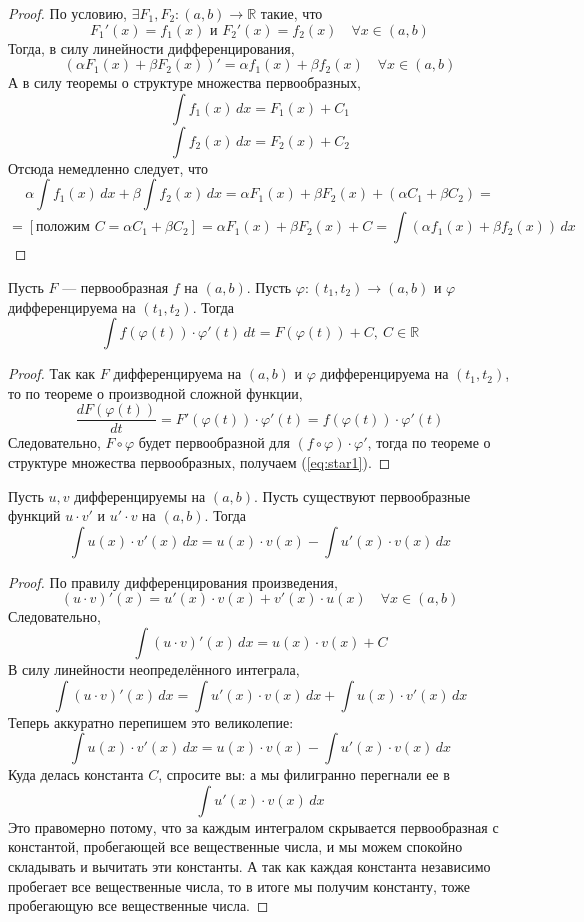 \documentclass[11pt]{article}
\begin{document}
\begin{proof}
    По условию, $\exists F_1, F_2: (a, b) \to \mathbb{R}$ такие, что \[F_1'(x) = f_1(x)
    \text{ и } F_2'(x) = f_2(x) \quad \forall x \in (a, b)\] Тогда, в силу линейности 
    дифференцирования, \[(\alpha F_1(x) + \beta F_2(x))' = \alpha f_1(x) + \beta f_2(x) \quad \forall x \in (a, b)\]
    А в силу теоремы о структуре множества первообразных, \[\int f_1(x)\,dx = F_1(x) + C_1\] 
    \[\int f_2(x)\,dx = F_2(x) + C_2\] Отсюда немедленно следует, что 
    \[\alpha \int f_1(x)\,dx + \beta \int f_2(x)\,dx = \alpha F_1(x) + \beta F_2 (x) + (\alpha C_1 + \beta C_2) =\] 
    \[= \left[\text{положим } C = \alpha C_1 + \beta C_2 \right] = \alpha F_1(x) + \beta F_2(x) + C = \int \left(\alpha f_1(x) + \beta f_2(x)\right) \,dx \]
\end{proof}

\begin{theorem}
    Пусть $F$ --- первообразная $f$ на $(a, b)$. Пусть $\varphi : (t_1, t_2) \to (a, b)$ 
    и $\varphi$ дифференцируема на $(t_1, t_2)$. Тогда \[\int f(\varphi(t)) \cdot \varphi'
    (t)\,dt = F(\varphi(t)) + C, \ C \in \mathbb{R} \label{eq:star1} \tag{$\ast$}\]
\end{theorem}

\begin{proof}
    Так как $F$ дифференцируема на $(a, b)$ и $\varphi$ дифференцируема на $(t_1, t_2)$, 
    то по теореме о производной сложной функции, \[\frac{dF(\varphi(t))}{dt} = 
    F'(\varphi(t)) \cdot \varphi'(t) = f(\varphi(t)) \cdot \varphi'(t)\]
    Следовательно, $F \circ \varphi$ будет первообразной для $(f \circ \varphi) 
    \cdot \varphi'$, тогда по теореме о структуре множества первообразных, получаем (\ref{eq:star1}).
\end{proof}

\begin{theorem}
    Пусть $u, v$ дифференцируемы на $(a, b)$. Пусть существуют первообразные функций $u \cdot v'$
    и $u' \cdot v$ на $(a, b)$. Тогда \[\int u(x) \cdot v'(x)\,dx = u(x) \cdot v(x) -
    \int u'(x) \cdot v(x)\,dx\]
\end{theorem}

\begin{proof}
    По правилу дифференцирования произведения, \[(u \cdot v)'(x) = u'(x) \cdot v(x)
    + v'(x) \cdot u(x) \quad \forall x \in (a, b)\] 
    Следовательно, \[\int (u \cdot v)' (x)\,dx = u(x) \cdot v(x) + C\]
    В силу линейности неопределённого интеграла, \[\int (u \cdot v)'(x)\,dx = 
    \int u'(x) \cdot v(x)\,dx + \int u(x) \cdot v'(x)\,dx\]
    Теперь аккуратно перепишем это великолепие: \[\int u(x) \cdot v'(x)\,dx = u(x) \cdot v(x) -
    \int u'(x) \cdot v(x)\,dx\] Куда делась константа $C$, спросите вы: а мы 
    филигранно перегнали ее в \[\int u'(x) \cdot v(x)\,dx\]
    Это правомерно потому, что за каждым интегралом скрывается первообразная с константой,
    пробегающей все вещественные числа, и мы можем спокойно складывать и вычитать эти константы.
    А так как каждая константа независимо пробегает все вещественные числа, то в итоге 
    мы получим константу, тоже пробегающую все вещественные числа.
\end{proof}
\end{document}
